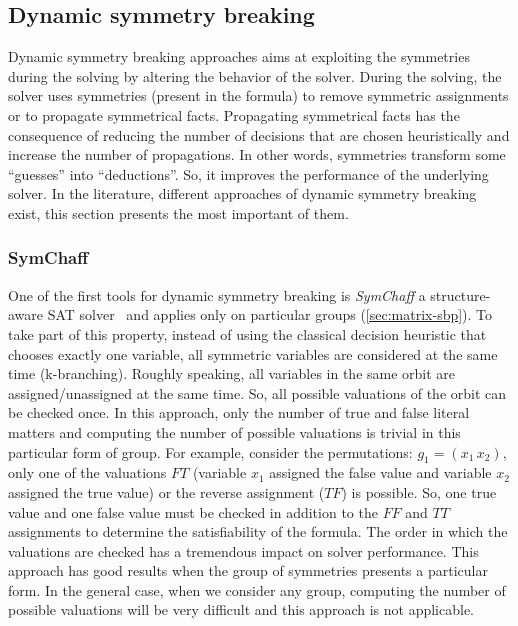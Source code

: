 %
%
%
%

% 

\subsection{Dynamic symmetry breaking}

Dynamic symmetry breaking approaches aims at exploiting the symmetries during the solving by altering the behavior of the solver.
During the solving, the solver uses symmetries (present in the formula) to remove symmetric assignments or to propagate symmetrical facts.
Propagating symmetrical facts has the consequence of reducing the number of decisions that are chosen heuristically and increase the number of propagations.
In other words, symmetries transform some “guesses” into “deductions”. So, it improves the performance of the underlying solver.
In the literature, different approaches of dynamic symmetry breaking exist, this section presents the most important of them.

\subsubsection{SymChaff}
One of the first tools for dynamic symmetry breaking is \emph{SymChaff} a structure-aware SAT solver~\cite{sabharwal2005symchaff}
and applies only on particular groups (\cref{sec:matrix-sbp}).
To take part of this property, instead of using the classical decision heuristic that chooses exactly one
variable, all symmetric variables are considered at the same time (k-branching). 
Roughly speaking, all variables in the same orbit are assigned/unassigned at the same time. So, all possible valuations 
of the orbit can be checked once. In this approach, only the number of true and false literal matters
and computing the number of possible valuations is trivial in this particular 
form of group. For example, consider the permutations: $g_1 = (x_1\, x_2)$,
only one of the valuations $F T$ (variable $x_1$ assigned the false value and variable $x_2$ assigned the true value) or the reverse assignment ($T F$) is possible.
 So, one true value and one false value must be checked in addition to the 
$F F$ and $T T$ assignments to determine the satisfiability of the formula.
 The order in which the valuations are checked has a tremendous impact on solver performance. 
This approach has good results when the group of symmetries presents a particular form.
In the general case, when we consider any group, computing the number of possible valuations will be very difficult and this approach is not applicable.

